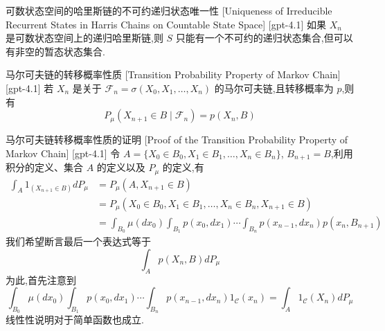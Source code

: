 \documentclass[UTF8]{ctexart}
\begin{document}
    
    
    \begin{thm}
        {可数状态空间的哈里斯链的不可约递归状态唯一性}
        [Uniqueness of Irreducible Recurrent States in Harris Chains on Countable State Space]
        [gpt-4.1]
        如果 $X_n$ 是可数状态空间上的递归哈里斯链,则 $S$ 只能有一个不可约的递归状态集合,但可以有非空的暂态状态集合.
    \end{thm}
    
    
    
    \begin{thm}
        {马尔可夫链的转移概率性质}
        [Transition Probability Property of Markov Chain]
        [gpt-4.1]
        若 $X_n$ 是关于 $\mathcal{F}_n = \sigma(X_0, X_1, \ldots, X_n)$ 的马尔可夫链,且转移概率为 $p$,则有
\[
P_{\mu}(X_{n+1} \in B \mid \mathcal{F}_n) = p(X_n, B)
\]

    \end{thm}
    
    
    
    \begin{prf}
        {马尔可夫链转移概率性质的证明}
        [Proof of the Transition Probability Property of Markov Chain]
        [gpt-4.1]
        令 $A = \{X_0 \in B_0, X_1 \in B_1, \ldots, X_n \in B_n\}$, $B_{n+1} = B$,利用积分的定义、集合 $A$ 的定义以及 $P_\mu$ 的定义,有
\[
\begin{array}{rl}
\int_{A} 1_{(X_{n+1} \in B)} dP_{\mu} &= P_{\mu}(A, X_{n+1} \in B) \\
&= P_{\mu}(X_{0} \in B_{0}, X_{1} \in B_{1}, \ldots, X_{n} \in B_{n}, X_{n+1} \in B) \\
&= \displaystyle \int_{B_{0}} \mu(dx_{0}) \int_{B_{1}} p(x_{0}, dx_{1}) \cdots \int_{B_{n}} p(x_{n-1}, dx_{n}) p(x_{n}, B_{n+1})
\end{array}
\]
我们希望断言最后一个表达式等于
\[
\int_{A} p(X_n, B) dP_\mu
\]
为此,首先注意到
\[
\int_{B_0} \mu(dx_0) \int_{B_1} p(x_0, dx_1) \cdots \int_{B_n} p(x_{n-1}, dx_n) 1_{\mathcal{C}}(x_n) = \int_{A} 1_{\mathcal{C}}(X_n) dP_\mu
\]
线性性说明对于简单函数也成立.

    \end{prf}
    
    
    
\end{document}
